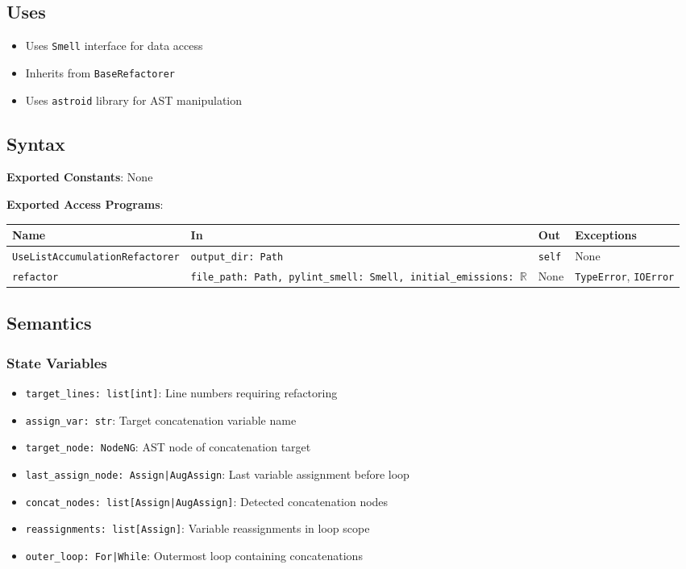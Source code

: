 \documentclass[12pt, titlepage]{article}
\begin{document}
  \subsection{Uses}
  \begin{itemize}
  \item Uses \texttt{Smell} interface for data access
  \item Inherits from \texttt{BaseRefactorer}
  \item Uses \texttt{astroid} library for AST manipulation
  \end{itemize}
  
  \subsection{Syntax}
  \noindent
  \textbf{Exported Constants}: None
  
  \noindent
  \textbf{Exported Access Programs}:
  
  \begin{tabularx}{\linewidth}{|
      l|
      >{\raggedright\arraybackslash}X|
      l|
      l|}
    \hline
    \textbf{Name} & \textbf{In} & \textbf{Out} & \textbf{Exceptions} \\
    \hline
    \texttt{UseListAccumulationRefactorer} & \texttt{output\_dir: Path} & \texttt{self} & None \\
    \hline
    \texttt{refactor} & \texttt{file\_path: Path, pylint\_smell: Smell, initial\_emissions: $\mathbb{R}$} & None & \texttt{TypeError}, \texttt{IOError} \\
    \hline
  \end{tabularx}
  
  \subsection{Semantics}
  
  \subsubsection{State Variables}
  \begin{itemize}
  \item \texttt{target\_lines: list[int]}: Line numbers requiring refactoring
  \item \texttt{assign\_var: str}: Target concatenation variable name
  \item \texttt{target\_node: NodeNG}: AST node of concatenation target
  \item \texttt{last\_assign\_node: Assign|AugAssign}: Last variable assignment before loop
  \item \texttt{concat\_nodes: list[Assign|AugAssign]}: Detected concatenation nodes
  \item \texttt{reassignments: list[Assign]}: Variable reassignments in loop scope
  \item \texttt{outer\_loop: For|While}: Outermost loop containing concatenations
  \end{itemize}
  
\end{document}

